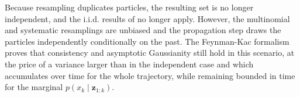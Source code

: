 \begin{algorithm}[!htb]
	\begin{algorithmic}
	\EndWhile
	\EndFor
	\end{algorithmic}\caption{Kitagawa Resampling}\label{alg:Kitagawa}
\end{algorithm}

\begin{remark}\label{th:loss_independence}
	Because resampling duplicates particles, the resulting set is no longer independent, and the i.i.d. results of  no longer apply. However, the multinomial and systematic resamplings are unbiased and the propagation step draws the particles independently conditionally on the past. The Feynman-Kac formalism proves \cite{bib:PF-convergence,bib:these-Oudjane} that consistency and asymptotic Gaussianity still hold in this scenario, at the price of a variance larger than in the independent case and which accumulates over time for the whole trajectory, while remaining bounded in time for the marginal $p(x_k\mid\mathbf{z}_{1:k})$.
\end{remark}
